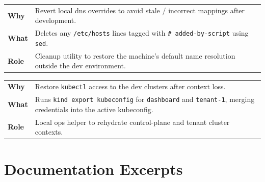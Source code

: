 \documentclass[11pt, a4paper, oneside, listof=totoc]{scrartcl}
\makeatletter
\newcommand{\codesummary}[3]{%
    \vspace{0.4\baselineskip}%
    \noindent\begin{tabularx}{\linewidth}{@{}>{\bfseries}l X@{}}
    Why  & #1\\
    What & #2\\
    Role & #3\\
    \end{tabularx}%
    \vspace{0.2\baselineskip}%
}
\makeatother
\begin{document}
        \clearpage

                \codesummary
                    {Revert local \gls{dns} overrides to avoid stale / incorrect mappings after development.}
                    {Deletes any \texttt{/etc/hosts} lines tagged with \texttt{\# added-by-script} using \texttt{sed}.}
                    {Cleanup utility to restore the machine's default name resolution outside the dev environment.}

                \codesummary
                    {Restore \texttt{kubectl} access to the dev clusters after context loss.}
                    {Runs \texttt{\gls{kind} export kubeconfig} for \texttt{dashboard} and \texttt{tenant-1}, merging credentials into the active kubeconfig.}
                    {Local ops helper to rehydrate control-plane and tenant cluster contexts.}

        \clearpage

        \section{Documentation Excerpts}\label{app:docs}
\end{document}
